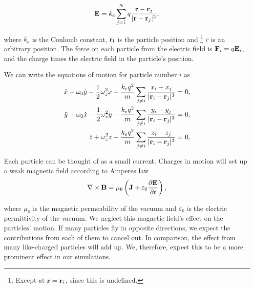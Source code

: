 \begin{equation}
\bold{E} = k_e\sum_{j=1}^Nq\frac{\bold{r} - \bold{r}_j}{|\bold{r} - \bold{r}_j|^3},
\end{equation}

where $k_e$ is the Coulomb constant, $\bold{r_i}$ is the particle position and
\footnote{Except at $\bold{r} = \bold{r}_i$, since this is undefined.}
$r$ is an arbitrary position. The force on each particle from the electric field is $\bold{F}_i = q\bold{E}_i$,
and the charge times the electric field in the particle's position.

We can write the equations of motion for particle number $i$ as
\begin{align}
  \ddot{x} - \omega_{0}\dot{y} - \frac{1}{2}\omega_{z}^{2}x -\frac{k_eq^2}{m}\sum_{j\neq i}
  \frac{x_i - x_j}{|\bold{r}_i - \bold{r}_j|^3} &= 0, \label{eq:eom_inter_x}\\
  \ddot{y} + \omega_{0}\dot{x} - \frac{1}{2}\omega_{z}^{2}y - \frac{k_eq^2}{m}\sum_{j\neq i}
\frac{y_i - y_j}{|\bold{r}_i - \bold{r}_j|^3}
&= 0, \label{eq:eom_inter_y}\\
  \ddot{z} + \omega_{z}^{2}z -\frac{k_eq^2}{m}\sum_{j\neq i}
  \frac{z_i - z_j}{|\bold{r}_i - \bold{r}_j|^3} &= 0, \label{eq:eom_inter_z}
\end{align}

Each particle can be thought of as a small current. Charges in motion will set up a weak magnetic field
according to Amperes law
\begin{equation}
\nabla \times \bold{B} = \mu_0 \left(\bold{J} + \varepsilon_0 \frac{\partial \bold{E}}{\partial t}\right),
\end{equation}

where $\mu_0$ is the magnetic permeability of the vacuum and $\varepsilon_0$ is the electric permittivity of
the vacuum. We neglect this magnetic field's effect on the particles' motion. If many particles
fly in opposite directions, we expect the contributions from each of them to cancel out.
In comparison, the effect from many like-charged particles will add up. We, therefore, expect this
to be a more prominent effect in our simulations.

